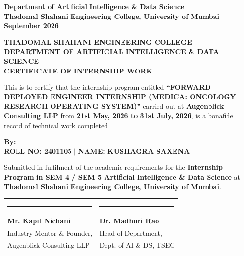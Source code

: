 \documentclass[11pt,a4paper]{article}
\begin{document}
\begin{titlepage}
    \vfill
    {\normalsize \textbf{Department of Artificial Intelligence \& Data Science}}\\
    {\normalsize \textbf{Thadomal Shahani Engineering College, University of Mumbai}}\\
    {\small \textbf{September 2026}}
\end{titlepage}

\thispagestyle{plain}
\begin{center}
    {\Large \textbf{THADOMAL SHAHANI ENGINEERING COLLEGE}}\\[0.15cm]
    {\large \textbf{DEPARTMENT OF ARTIFICIAL INTELLIGENCE \& DATA SCIENCE}}\\[0.2cm]
    {\large \textbf{CERTIFICATE OF INTERNSHIP WORK}}\\[0.4cm]
\end{center}

This is to certify that the internship program entitled \textbf{``FORWARD DEPLOYED ENGINEER INTERNSHIP (MEDICA: ONCOLOGY RESEARCH OPERATING SYSTEM)''} carried out at \textbf{Augenblick Consulting LLP} from \textbf{21st May, 2026 to 31st July, 2026}, is a bonafide record of technical work completed

\begin{center}
    \textbf{By:}\\[0.1cm]
    \textbf{\large ROLL NO: 2401105} \quad $\vert$ \quad \textbf{\Large NAME: KUSHAGRA SAXENA}
\end{center}

Submitted in fulfilment of the academic requirements for the \textbf{Internship Program in SEM 4 / SEM 5 Artificial Intelligence \& Data Science} at \textbf{Thadomal Shahani Engineering College, University of Mumbai}.

\vspace{1.8cm}

\noindent
\begin{tabularx}{\textwidth}{X X}
    \rule{6.2cm}{0.4pt} & \rule{6.2cm}{0.4pt}\\
    \textbf{Mr. Kapil Nichani} & \textbf{Dr. Madhuri Rao}\\
    Industry Mentor \& Founder, & Head of Department,\\
    Augenblick Consulting LLP & Dept. of AI \& DS, TSEC\\
\end{tabularx}
\end{document}
